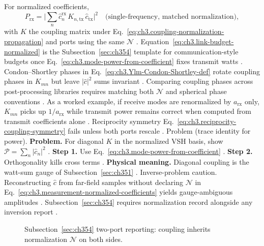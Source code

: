 For normalized coefficients,
\begin{equation}
\label{eq:ch3.link-budget-normalized}
P_{\mathrm{rx}}
=
\Big|\sum_{n}\widehat{c}_{n}^{\mathrm{rx}}\,K_{n,\mathrm{tx}}\,\widehat{c}_{\mathrm{tx}}\Big|^{2}
\quad\text{(single-frequency, matched normalization)},
\end{equation}
with \(K\) the coupling matrix under Eq.~\eqref{eq:ch3.coupling-normalization-propagation} and ports using the same
\(\mathcal{N}\) \cite{harrington2001}. Equation~\eqref{eq:ch3.link-budget-normalized} is the Subsection~\ref{sec:ch354}
template for communication-style budgets once Eq.~\eqref{eq:ch3.mode-power-from-coefficient} fixes transmit watts
\cite{harrington2001}.
Condon--Shortley phases in Eq.~\eqref{eq:ch3.Ylm-Condon-Shortley-def} rotate coupling phases in \(K_{mn}\) but leave
\(|\widehat{c}|^{2}\) sums invariant \cite{hansen1988}. Comparing coupling phases across post-processing libraries
requires matching both \(\mathcal{N}\) and spherical phase conventions \cite{hansen1988}.
As a worked example, if receive modes are renormalized by \(a_{\mathrm{rx}}\) only, \(K_{mn}\) picks up \(1/a_{\mathrm{rx}}\) while transmit
power remains correct when computed from transmit coefficients alone \cite{harrington2001}. Reciprocity symmetry
Eq.~\eqref{eq:ch3.reciprocity-coupling-symmetry} fails unless both ports rescale \cite{stratton1941}.
Problem (trace identity for power). \textbf{Problem.} For diagonal \(K\) in the normalized VSH basis, show \(\mathcal{P}=\sum_{n}|\widehat{c}_{n}|^{2}\)
\cite{hansen1988}.
\textbf{Step 1.} Use Eq.~\eqref{eq:ch3.mode-power-from-coefficient} \cite{poynting1884}.
\textbf{Step 2.} Orthogonality kills cross terms \cite{hansen1988}.
\textbf{Physical meaning.} Diagonal coupling is the watt-sum gauge of Subsection~\ref{sec:ch351} \cite{harrington2001}.
Inverse-problem caution. Reconstructing \(\widehat{c}\) from far-field samples without declaring \(\mathcal{N}\) in
Eq.~\eqref{eq:ch3.measurement-normalized-coefficients} yields gauge-ambiguous amplitudes \cite{devaney2004}.
Subsection~\ref{sec:ch354} requires normalization record alongside any inversion report \cite{harrington2001}.
\begin{figure}[t]
\centering
{}
\caption{Subsection~\ref{sec:ch354} two-port reporting: coupling inherits normalization \(\mathcal{N}\) on both sides.}
\label{fig:ch3.354-two-port-normalization}
\end{figure}
